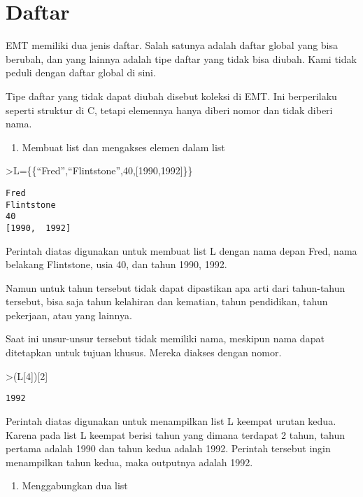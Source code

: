 \documentclass[
]{book}
\providecommand{\tightlist}{%
  \setlength{\itemsep}{0pt}\setlength{\parskip}{0pt}}
\begin{document}
\chapter{Daftar}\label{daftar}

EMT memiliki dua jenis daftar. Salah satunya adalah daftar global yang bisa berubah, dan yang lainnya adalah tipe daftar yang tidak bisa diubah. Kami tidak peduli dengan daftar global di sini.

Tipe daftar yang tidak dapat diubah disebut koleksi di EMT. Ini berperilaku seperti struktur di C, tetapi elemennya hanya diberi nomor dan tidak diberi nama.

\begin{enumerate}
\def\labelenumi{\arabic{enumi}.}
\tightlist
\item
  Membuat list dan mengakses elemen dalam list
\end{enumerate}

\textgreater L=\{\{``Fred'',``Flintstone'',40,{[}1990,1992{]}\}\}

\begin{verbatim}
Fred
Flintstone
40
[1990,  1992]
\end{verbatim}

Perintah diatas digunakan untuk membuat list L dengan nama depan Fred, nama belakang Flintstone, usia 40, dan tahun 1990, 1992.

Namun untuk tahun tersebut tidak dapat dipastikan apa arti dari tahun-tahun tersebut, bisa saja tahun kelahiran dan kematian, tahun pendidikan, tahun pekerjaan, atau yang lainnya.

Saat ini unsur-unsur tersebut tidak memiliki nama, meskipun nama dapat ditetapkan untuk tujuan khusus. Mereka diakses dengan nomor.

\textgreater(L{[}4{]}){[}2{]}

\begin{verbatim}
1992
\end{verbatim}

Perintah diatas digunakan untuk menampilkan list L keempat urutan kedua. Karena pada list L keempat berisi tahun yang dimana terdapat 2 tahun, tahun pertama adalah 1990 dan tahun kedua adalah 1992. Perintah tersebut ingin menampilkan tahun kedua, maka outputnya adalah 1992.

\begin{enumerate}
\def\labelenumi{\arabic{enumi}.}
\setcounter{enumi}{1}
\tightlist
\item
  Menggabungkan dua list
\end{enumerate}
\end{document}
